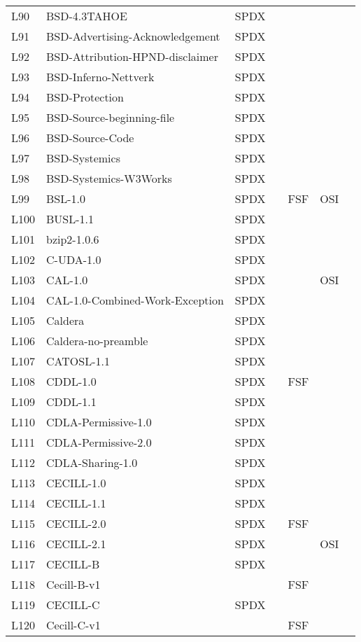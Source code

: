 \begin{longtable}[h]{m{2cm} | m{7cm} | c | c | c | c | c}
L90 & BSD-4.3TAHOE & SPDX &  &  &  &  \\
L91 & BSD-Advertising-Acknowledgement & SPDX &  &  &  &  \\
L92 & BSD-Attribution-HPND-disclaimer & SPDX &  &  &  &  \\
L93 & BSD-Inferno-Nettverk & SPDX &  &  &  &  \\
L94 & BSD-Protection & SPDX &  &  &  &  \\
L95 & BSD-Source-beginning-file & SPDX &  &  &  &  \\
L96 & BSD-Source-Code & SPDX &  &  &  &  \\
L97 & BSD-Systemics & SPDX &  &  &  &  \\
L98 & BSD-Systemics-W3Works & SPDX &  &  &  &  \\
L99 & BSL-1.0 & SPDX &  & FSF & OSI &  \\
L100 & BUSL-1.1 & SPDX &  &  &  &  \\
L101 & bzip2-1.0.6 & SPDX &  &  &  &  \\
L102 & C-UDA-1.0 & SPDX &  &  &  &  \\
L103 & CAL-1.0 & SPDX &  &  & OSI &  \\
L104 & CAL-1.0-Combined-Work-Exception & SPDX &  &  &  &  \\
L105 & Caldera & SPDX &  &  &  &  \\
L106 & Caldera-no-preamble & SPDX &  &  &  &  \\
L107 & CATOSL-1.1 & SPDX &  &  &  &  \\
L108 & CDDL-1.0 & SPDX &  & FSF &  &  \\
L109 & CDDL-1.1 & SPDX &  &  &  &  \\
L110 & CDLA-Permissive-1.0 & SPDX &  &  &  &  \\
L111 & CDLA-Permissive-2.0 & SPDX &  &  &  &  \\
L112 & CDLA-Sharing-1.0 & SPDX &  &  &  &  \\
L113 & CECILL-1.0 & SPDX &  &  &  &  \\
L114 & CECILL-1.1 & SPDX &  &  &  &  \\
L115 & CECILL-2.0 & SPDX &  & FSF &  &  \\
L116 & CECILL-2.1 & SPDX &  &  & OSI &  \\
L117 & CECILL-B & SPDX &  &  &  &  \\
L118 & Cecill-B-v1 &  &  & FSF &  &  \\
L119 & CECILL-C & SPDX &  &  &  &  \\
L120 & Cecill-C-v1 &  &  & FSF &  &  \\

\end{longtable}
